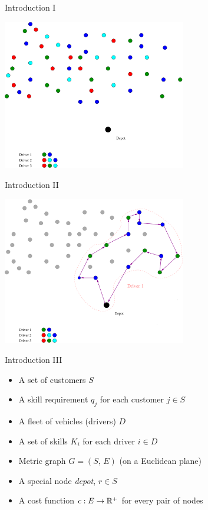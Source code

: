 \documentclass[10pt]{beamer}
\begin{document}
\begin{frame}{Introduction I}
\begin{example}
    \begin{center}
            \includegraphics[width=8cm]{VRPSS01.pdf} 
    \end{center}
\end{example}
\end{frame}

\begin{frame}{Introduction II}
\begin{example}
    \begin{center}
            \includegraphics[width=8cm]{VRPSS03.pdf} 
    \end{center}
\end{example}
\end{frame}

\begin{frame}{Introduction III}
\begin{itemize}
    \item<1-> A set of \alert{customers} $S$
    \item<2-> A skill requirement $q_j$ for each customer $j \in S$
    \item<3-> A fleet of vehicles (\alert{drivers}) $D$
    \item<4-> A set of skills $K_i$ for each driver $i \in D$
    \item<5-> Metric graph $G = (S, \, E)$ (on a Euclidean plane) 
    \item<6-> A special node \emph{depot}, $r \in S$
    \item<7-> A cost function $c:E \rightarrow \mathbb{R}^+$ for every pair of nodes
\end{itemize}
\end{frame}
\end{document}
